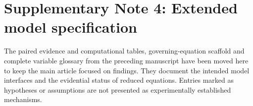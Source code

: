 \documentclass[11pt,a4paper]{article}
\begin{document}
\clearpage
\section*{Supplementary Note 4: Extended model specification}

The paired evidence and computational tables, governing-equation scaffold and complete variable glossary from the preceding manuscript have been moved here to keep the main article focused on findings. They document the intended model interfaces and the evidential status of reduced equations. Entries marked as hypotheses or assumptions are not presented as experimentally established mechanisms.

\setlength{\tabcolsep}{3pt}




\end{document}
